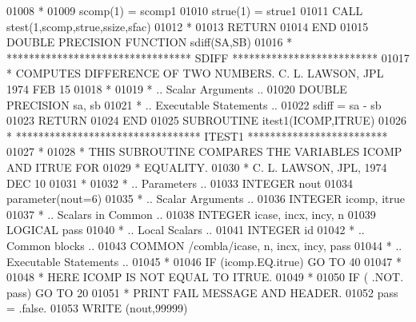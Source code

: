 \begin{DoxyCode}
01008 \textcolor{comment}{*}
01009       scomp(1) = scomp1
01010       strue(1) = strue1
01011       \textcolor{keyword}{CALL }stest(1,scomp,strue,ssize,sfac)
01012 \textcolor{comment}{*}
01013       \textcolor{keywordflow}{RETURN}
01014 \textcolor{keyword}{      END}
01015 \textcolor{keyword}{      DOUBLE PRECISION }\textcolor{keyword}{FUNCTION }sdiff(SA,SB)
01016 \textcolor{comment}{*     ********************************* SDIFF **************************}
01017 \textcolor{comment}{*     COMPUTES DIFFERENCE OF TWO NUMBERS.  C. L. LAWSON, JPL 1974 FEB 15}
01018 \textcolor{comment}{*}
01019 \textcolor{comment}{*     .. Scalar Arguments ..}
01020       \textcolor{keywordtype}{DOUBLE PRECISION}                sa, sb
01021 \textcolor{comment}{*     .. Executable Statements ..}
01022       sdiff = sa - sb
01023       \textcolor{keywordflow}{RETURN}
01024 \textcolor{keyword}{      END}
01025 \textcolor{keyword}{      SUBROUTINE }itest1(ICOMP,ITRUE)
01026 \textcolor{comment}{*     ********************************* ITEST1 *************************}
01027 \textcolor{comment}{*}
01028 \textcolor{comment}{*     THIS SUBROUTINE COMPARES THE VARIABLES ICOMP AND ITRUE FOR}
01029 \textcolor{comment}{*     EQUALITY.}
01030 \textcolor{comment}{*     C. L. LAWSON, JPL, 1974 DEC 10}
01031 \textcolor{comment}{*}
01032 \textcolor{comment}{*     .. Parameters ..}
01033       \textcolor{keywordtype}{INTEGER}           nout
01034       parameter(nout=6)
01035 \textcolor{comment}{*     .. Scalar Arguments ..}
01036       \textcolor{keywordtype}{INTEGER}           icomp, itrue
01037 \textcolor{comment}{*     .. Scalars in Common ..}
01038       \textcolor{keywordtype}{INTEGER}           icase, incx, incy, n
01039       \textcolor{keywordtype}{LOGICAL}           pass
01040 \textcolor{comment}{*     .. Local Scalars ..}
01041       \textcolor{keywordtype}{INTEGER}           id
01042 \textcolor{comment}{*     .. Common blocks ..}
01043       \textcolor{keyword}{COMMON}            /combla/icase, n, incx, incy, pass
01044 \textcolor{comment}{*     .. Executable Statements ..}
01045 \textcolor{comment}{*}
01046       \textcolor{keywordflow}{IF} (icomp.EQ.itrue) \textcolor{keywordflow}{GO TO} 40
01047 \textcolor{comment}{*}
01048 \textcolor{comment}{*                            HERE ICOMP IS NOT EQUAL TO ITRUE.}
01049 \textcolor{comment}{*}
01050       \textcolor{keywordflow}{IF} ( .NOT. pass) \textcolor{keywordflow}{GO TO} 20
01051 \textcolor{comment}{*                             PRINT FAIL MESSAGE AND HEADER.}
01052       pass = .false.
01053       \textcolor{keyword}{WRITE} (nout,99999)

\end{DoxyCode}
